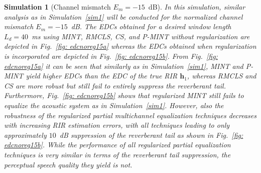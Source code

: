 \documentclass[10pt]{IEEEtran}
\newtheorem{simulation}{Simulation}
\begin{document}
\begin{simulation}[Channel mismatch $E_m=-15$~dB]
\label{sim2}
In this simulation, similar analysis as in Simulation~\ref{sim1} will be conducted for the normalized channel mismatch $E_m = -15$~dB.
The EDCs obtained for a desired window length $L_d = 40$~ms using MINT, RMCLS, CS, and P-MINT without regularization are depicted in Fig.~\ref{fig: edcnoreg15a} whereas the EDCs obtained when regularization is incorporated are depicted in Fig.~\ref{fig: edcnoreg15b}.
From Fig.~\ref{fig: edcnoreg15a} it can be seen that similarly as in Simulation~\ref{sim1}, MINT and P-MINT yield higher EDCs than the EDC of the true RIR $\mathbf{h}_1$, whereas RMCLS and CS are more robust but still fail to entirely suppress the reverberant tail.
Furthermore, Fig.~\ref{fig: edcnoreg15b} shows that regularized MINT still fails to equalize the acoustic system as in Simulation~\ref{sim1}.
However, also the robustness of the regularized partial multichannel equalization techniques decreases with increasing RIR estimation errors, with all techniques leading to only approximately $10$~dB suppression of the reverberant tail as shown in Fig.~\ref{fig: edcnoreg15b}.
While the performance of all regularized partial equalization techniques is very similar in terms of the reverberant tail suppression, the perceptual speech quality they yield is not.


\end{simulation}
\end{document}
